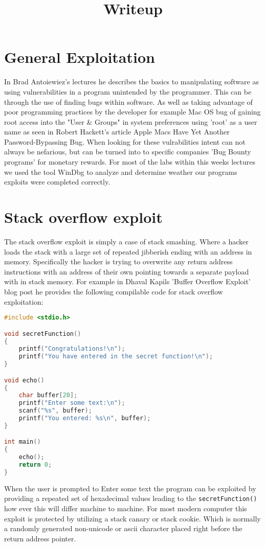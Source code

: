 \documentclass[letterpaper,12pt,titlepage,onecolumn]{IEEEtran}
\author{\name}
\title{Writeup}
\begin{document}
\maketitle
\hrulefill

\section{General Exploitation}
In Brad Antoiewiez's lectures he describes the basics to manipulating software as using vulnerabilities in a program unintended by the programmer. This can be through the use of finding bugs within software. As well as taking advantage of poor programming practices by the developer for example Mac OS bug of gaining root access into the "User & Groups" in system preferences using 'root' as a user name as seen in Robert Hackett's article Apple Macs Have Yet Another Password-Bypassing Bug. When looking for these vulrabilities intent can not always be nefarious, but can be turned into to specific companies 'Bug Bounty programs' for monetary rewards. For most of the labs within this weeks lectures we used the tool WinDbg to analyze and determine weather our programs exploits were completed correctly.

\section{Stack overflow exploit}
The stack overflow exploit is simply a case of stack smashing. Where a hacker loads the stack with a large set of repeated jibberish ending with an address in memory. Specifically the hacker is trying to overwrite any return address instructions with an address of their own pointing towards a separate payload with in stack memory. For example in Dhaval Kapils 'Buffer Overflow Exploit' blog post he provides the following compilable code for stack overflow exploitation:

\begin{lstlisting}[language=C]
#include <stdio.h>

void secretFunction()
{
    printf("Congratulations!\n");
    printf("You have entered in the secret function!\n");
}

void echo()
{
    char buffer[20];
    printf("Enter some text:\n");
    scanf("%s", buffer);
    printf("You entered: %s\n", buffer);    
}

int main()
{
    echo();
    return 0;
}
\end{lstlisting}
When the user is prompted to Enter some text the program can be exploited by providing a repeated set of hexadecimal values leading to the \texttt{secretFunction()} how ever this will differ machine to machine. For most modern computer this exploit is protected by utilizing a stack canary or stack cookie. Which is normally a randomly generated non-unicode or ascii character placed right before the return address pointer.
\end{document}
